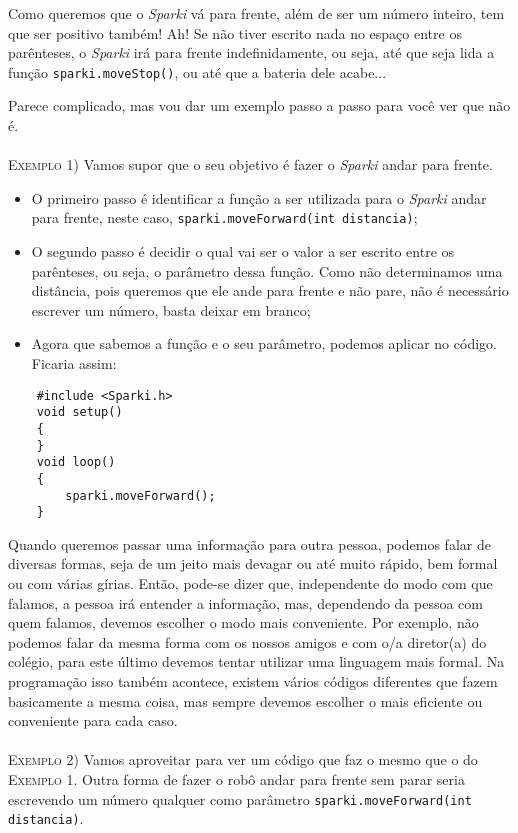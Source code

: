     Como queremos que o \textsl{Sparki} vá para frente, além de ser um número inteiro, tem que ser positivo também! Ah! Se não tiver escrito nada no espaço entre os parênteses, o \textsl{Sparki} irá para frente indefinidamente, ou seja, até que seja lida a função \texttt{sparki.moveStop()}, ou até que a bateria dele acabe...
    
    Parece complicado, mas vou dar um exemplo passo a passo para você ver que não é.
    \\
    \\
    \textsc{Exemplo 1)} Vamos supor que o seu objetivo é fazer o \textsl{Sparki} andar para frente.
    
    \begin{itemize}
        \item O primeiro passo é identificar a função a ser utilizada para o \textsl{Sparki} andar para frente, neste caso, \texttt{sparki.moveForward(int distancia)};
        \item O segundo passo é decidir o qual vai ser o valor a ser escrito entre os parênteses, ou seja, o parâmetro dessa função. Como não determinamos uma distância, pois queremos que ele ande para frente e não pare, não é necessário escrever um número, basta deixar em branco;
        \item Agora que sabemos a função e o seu parâmetro, podemos aplicar no código. Ficaria assim:
    \end{itemize}
    
    \begin{verbatim}
    #include <Sparki.h>
    void setup()
    {
    }
    void loop()
    {
        sparki.moveForward();
    }
    \end{verbatim}
    
    Quando queremos passar uma informação para outra pessoa, podemos falar de diversas formas, seja de um jeito mais devagar ou até muito rápido, bem formal ou com várias gírias. Então, pode-se dizer que, independente do modo com que falamos, a pessoa irá entender a informação, mas, dependendo da pessoa com quem falamos, devemos escolher o modo mais conveniente. Por exemplo, não podemos falar da mesma forma com os nossos amigos e com o/a diretor(a) do colégio, para este último devemos tentar utilizar uma linguagem mais formal. Na programação isso também acontece, existem vários códigos diferentes que fazem basicamente a mesma coisa, mas sempre devemos escolher o mais eficiente ou conveniente para cada caso.
    \\
    \\
    \textsc{Exemplo 2)} Vamos aproveitar para ver um código que faz o mesmo que o do \textsc{Exemplo 1}. Outra forma de fazer o robô andar para frente sem parar seria escrevendo um número qualquer como parâmetro \texttt{sparki.moveForward(int distancia)}.
    
